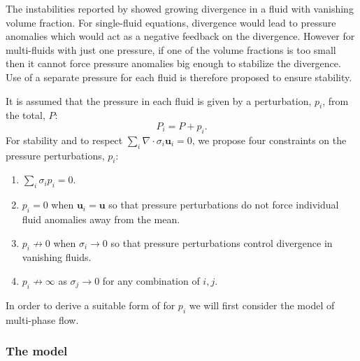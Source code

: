 \documentclass[draft]{agujournal2019}
\begin{document}
The instabilities reported by  showed growing divergence
in a fluid with vanishing volume fraction. For single-fluid equations, divergence would lead to pressure anomalies which would act as a negative feedback on the divergence. However for multi-fluids with just one pressure, if one of the volume fractions is too small then it cannot force pressure anomalies big enough to stabilize the divergence. Use of a separate pressure for each fluid is therefore proposed to ensure stability.

It is assumed that the  pressure  in each fluid is given by a perturbation, $p_{i}$, from the total, $P$:
\begin{equation}
P_{i}=P+p_{i}.
\end{equation}
For stability and to respect $\sum_i \nabla\cdot\sigma_i\mathbf{u}_i=0$, we propose four constraints on the pressure perturbations, $p_i$:
\begin{enumerate}
\item $\sum_{i}\sigma_{i}p_{i}=0$.
\item $p_i=0$ when $\mathbf{u}_{i}=\mathbf{u}$ so that pressure perturbations do not force individual fluid anomalies away from the mean.
\item $p_i \not\to 0$ when $\sigma_i\to 0$ so that pressure perturbations control divergence in vanishing fluids.
\item $p_i\not\to\infty$ as $\sigma_j\to 0$ for any combination of $i,j$.
\end{enumerate}


In order to derive a suitable form of  for $p_i$ we will first consider the  model of multi-phase flow.

\subsubsection{The \protect{} model}
\end{document}
